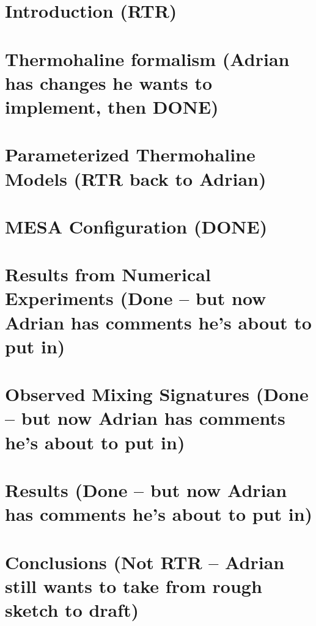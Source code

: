 \documentclass[linenumbers,twocolumn]{aastex62}
\begin{document}

\section{Introduction \textbf{(RTR)} }
\label{sec:intro}
\setcounter{footnote}{0}


\section{Thermohaline formalism \textbf{(Adrian has changes he wants to implement, then DONE)}}
\label{sec:formalism}


\section{Parameterized Thermohaline Models \textbf{(RTR back to Adrian)}}
\label{sec:parameterizations}


\section{MESA Configuration \textbf{(DONE)}}
\label{sec:mesa_experiment}


\section{Results from Numerical Experiments \textbf{(Done -- but now Adrian has comments he's about to put in)}}
\label{sec:mesa_results}


\section{Observed Mixing Signatures \bf({Done -- but now Adrian has comments he's about to put in})}
\label{sec:obs}


\section{Results \bf{(Done -- but now Adrian has comments he's about to put in)}} 
\label{sec:punchline}


\section{Conclusions \textbf{(Not RTR -- Adrian still wants to take from rough sketch to draft)}}
\label{sec:conclusions}

\end{document}

